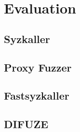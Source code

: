 \section{Evaluation}


\subsection{Syzkaller}

\subsection{Proxy Fuzzer}

\subsection{Fastsyzkaller}

\subsection{DIFUZE}
